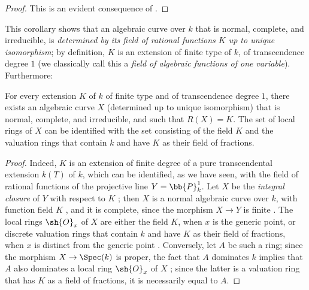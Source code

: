 \begin{proof}
This is an evident consequence of .
\end{proof}

\begin{env}[7.4.17]
\label{II.7.4.17}
This corollary  shows that an algebraic curve over $k$ that is normal, complete, and irreducible, is \emph{determined by its field of rational functions $K$ up to unique isomorphism};
by definition, $K$ is an extension of finite type of $k$, of transcendence degree $1$ (we classically call this a \emph{field of algebraic functions of one variable}).
Furthermore:
\end{env}

\begin{proposition}[7.4.18]
\label{II.7.4.18}
For every extension $K$ of $k$ of finite type and of transcendence degree $1$, there exists an algebraic curve $X$ (determined up to unique isomorphism) that is normal, complete, and irreducible, and such that $R(X)=K$.
The set of local rings of $X$ can be identified  with the set consisting of the field $K$ and the valuation rings that contain $k$ and have $K$ as their field of fractions.
\end{proposition}

\begin{proof}
Indeed, $K$ is an extension of finite degree of a pure transcendental extension $k(T)$ of $k$, which can be identified, as we have seen, with the field of rational functions of the projective line $Y=\bb{P}_k^1$.
Let $X$ be the \emph{integral closure} of $Y$ with respect to $K$ ;
then $X$ is a normal algebraic curve over $k$, with function field $K$ , and it is complete, since the morphism $X\to Y$ is finite .
The local rings $\sh{O}_x$ of $X$ are either the field $K$, when $x$ is the generic point, or discrete valuation rings that contain $k$ and have $K$ as their field of fractions, when $x$ is distinct from the generic point .
Conversely, let $A$ be such a ring;
since the morphism $X\to\Spec(k)$ is proper, the fact that $A$ dominates $k$ implies that $A$ also dominates a local ring $\sh{O}_x$ of $X$ ;
since the latter is a valuation ring that has $K$ as a field of fractions, it is necessarily equal to $A$.
\end{proof}

